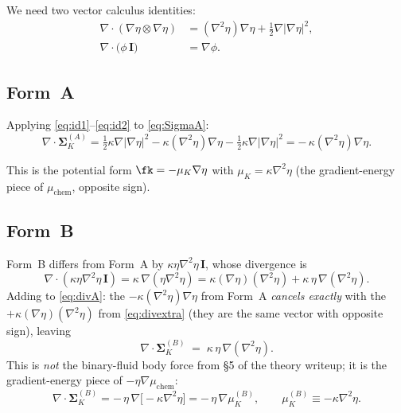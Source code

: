 \documentclass[11pt]{article}
\newcommand{\dive}{\nabla\!\cdot\!}
\newcommand{\grad}{\nabla}
\newcommand{\II}{\mathbf{I}}
\newcommand{\SK}{\boldsymbol{\Sigma}_K}
\begin{document}
We need two vector calculus identities:
\begin{align}
\dive(\grad\eta\!\otimes\!\grad\eta)
   &= (\grad^2\eta)\grad\eta + \tfrac{1}{2}\grad|\grad\eta|^2,
\label{eq:id1}\\
\dive\!\big(\phi\,\II\big) &= \grad\phi.
\label{eq:id2}
\end{align}

\subsection{Form~A}

Applying \eqref{eq:id1}--\eqref{eq:id2} to \eqref{eq:SigmaA}:
\begin{equation}
\dive\SK^{(A)}
   = \tfrac{1}{2}\kappa\grad|\grad\eta|^2 - \kappa(\grad^2\eta)\grad\eta - \tfrac{1}{2}\kappa\grad|\grad\eta|^2
   = -\,\kappa(\grad^2\eta)\grad\eta.
\label{eq:divA}
\end{equation}

This is the potential form $\fk = -\mu_K\grad\eta$ with $\mu_K=\kappa\grad^2\eta$
(the gradient-energy piece of $\mu_{\mathrm{chem}}$, opposite sign).

\subsection{Form~B}

Form~B differs from Form~A by $\kappa\eta\grad^2\eta\,\II$, whose divergence is
\begin{equation}
\dive(\kappa\eta\grad^2\eta\,\II) = \kappa\,\grad(\eta\grad^2\eta)
   = \kappa(\grad\eta)(\grad^2\eta) + \kappa\,\eta\,\grad(\grad^2\eta).
\label{eq:divextra}
\end{equation}
Adding to \eqref{eq:divA}: the $-\kappa(\grad^2\eta)\grad\eta$ from Form~A
\emph{cancels exactly} with the $+\kappa(\grad\eta)(\grad^2\eta)$ from
\eqref{eq:divextra} (they are the same vector with opposite sign), leaving
\begin{equation}
\boxed{\,\dive\SK^{(B)} \;=\; \kappa\,\eta\,\grad(\grad^2\eta).\,}
\label{eq:divB}
\end{equation}
This is \emph{not} the binary-fluid body force from \S5 of the theory
writeup; it is the gradient-energy piece of $-\eta\grad\mu_{\mathrm{chem}}$:
\begin{equation}
\dive\SK^{(B)} = -\,\eta\,\grad\!\big[-\kappa\grad^2\eta\big]
              = -\,\eta\,\grad\mu_K^{\!(B)},\qquad \mu_K^{\!(B)}\equiv-\kappa\grad^2\eta.
\label{eq:divBalt}
\end{equation}
\end{document}
